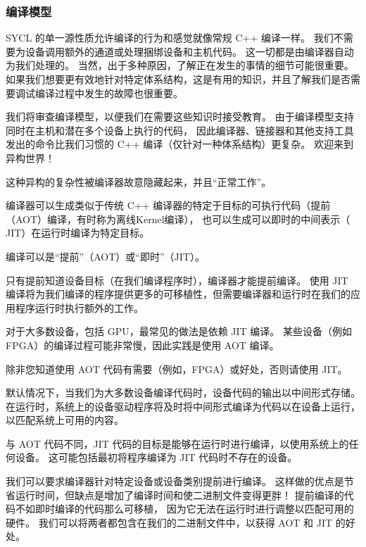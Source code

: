 \subsubsection{编译模型}
SYCL 的单一源性质允许编译的行为和感觉就像常规 C++ 编译一样。 
我们不需要为设备调用额外的通道或处理捆绑设备和主机代码。 这一切都是由编译器自动为我们处理的。 
当然，出于多种原因，了解正在发生的事情的细节可能很重要。 
如果我们想要更有效地针对特定体系结构，这是有用的知识，并且了解我们是否需要调试编译过程中发生的故障也很重要。

我们将审查编译模型，以便我们在需要这些知识时接受教育。 
由于编译模型支持同时在主机和潜在多个设备上执行的代码，
因此编译器、链接器和其他支持工具发出的命令比我们习惯的 C++ 编译（仅针对一种体系结构）更复杂。 欢迎来到异构世界！

这种异构的复杂性被编译器故意隐藏起来，并且“正常工作”。

编译器可以生成类似于传统 C++ 编译器的特定于目标的可执行代码（提前（AOT）编译，有时称为离线Kernel编译），
也可以生成可以即时的中间表示（ JIT）在运行时编译为特定目标。

\begin{remark}
	编译可以是“提前”（AOT）或“即时”（JIT）。
\end{remark}

只有提前知道设备目标（在我们编译程序时），编译器才能提前编译。 
使用 JIT 编译将为我们编译的程序提供更多的可移植性，但需要编译器和运行时在我们的应用程序运行时执行额外的工作。

对于大多数设备，包括 GPU，最常见的做法是依赖 JIT 编译。 
某些设备（例如 FPGA）的编译过程可能非常慢，因此实践是使用 AOT 编译。

\begin{remark}
	除非您知道使用 AOT 代码有需要（例如，FPGA）或好处，否则请使用 JIT。
\end{remark}

默认情况下，当我们为大多数设备编译代码时，设备代码的输出以中间形式存储。 
在运行时，系统上的设备驱动程序将及时将中间形式编译为代码以在设备上运行，以匹配系统上可用的内容。

\begin{remark}
	与 AOT 代码不同，JIT 代码的目标是能够在运行时进行编译，以使用系统上的任何设备。
	这可能包括最初将程序编译为 JIT 代码时不存在的设备。
\end{remark}

我们可以要求编译器针对特定设备或设备类别提前进行编译。 
这样做的优点是节省运行时间，但缺点是增加了编译时间和使二进制文件变得更胖！ 提前编译的代码不如即时编译的代码那么可移植，
因为它无法在运行时进行调整以匹配可用的硬件。 我们可以将两者都包含在我们的二进制文件中，以获得 AOT 和 JIT 的好处。

